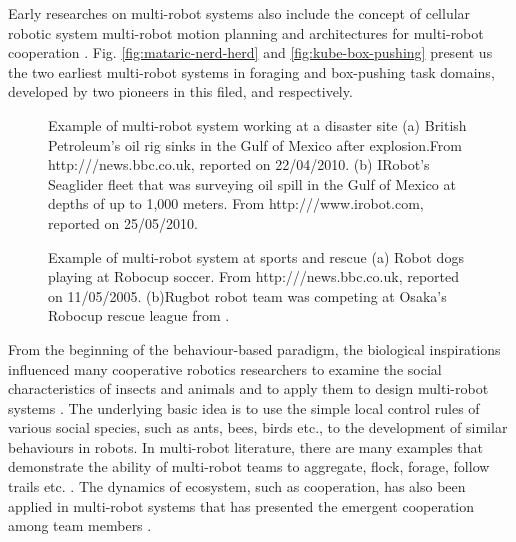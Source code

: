 Early researches on multi-robot systems also include the concept of cellular robotic system \cite{Fukuda+1987,Beni1988} multi-robot motion planning \cite{Arai+1989,Premvuti+1990,Wang1989} and architectures for multi-robot cooperation \cite{Asama+1989}. Fig. \ref{fig:mataric-nerd-herd} and \ref{fig:kube-box-pushing} present us the two earliest multi-robot systems in foraging and box-pushing task domains, developed by two pioneers in this filed,  and  respectively.

\begin{figure}
\centering
{} 
\hspace{0.25cm}
\caption{Example of multi-robot system working at a disaster site (a) British Petroleum's oil rig sinks in the Gulf of Mexico after explosion.\protect\newline From http:///news.bbc.co.uk, reported on 22/04/2010. 
(b) IRobot's Seaglider fleet that was surveying oil spill in the Gulf of Mexico at depths of up to 1,000 meters. From http:///www.irobot.com, reported on 25/05/2010.}
\label{fig:bp-oil-disaster}
\end{figure}
\begin{figure}
\centering
{} 
\hspace{0.25cm}
\caption{Example of multi-robot system at sports and rescue (a) Robot dogs playing at Robocup soccer. \protect\newline From http:///news.bbc.co.uk, reported on 11/05/2005. 
(b)Rugbot robot team was competing at Osaka's Robocup rescue league from \protect{}.}
\label{fig:robocup}
\end{figure}
From the beginning of the behaviour-based paradigm, the biological inspirations influenced many cooperative robotics researchers to examine the social characteristics of insects and animals and to apply them to design multi-robot systems \cite{Arkin1998}. The underlying basic idea is to use the simple local control rules of various social species, such as ants, bees, birds etc., to the development of similar behaviours in robots. In multi-robot literature, there are many examples that demonstrate the ability of multi-robot teams to aggregate, flock, forage, follow trails etc. \cite{Bonabeau+1999}. The dynamics of ecosystem, such as cooperation, has also been applied in multi-robot systems that has presented the emergent cooperation among team members \cite{Mcfarland1994,Martinoli+1996}. 

